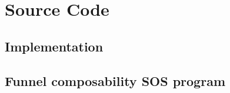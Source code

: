 \chapter{Source Code}
\label{sec:source}
\section{Implementation}

\section{Funnel composability SOS program}
\label{sec:funnel-composability-program-sos}

